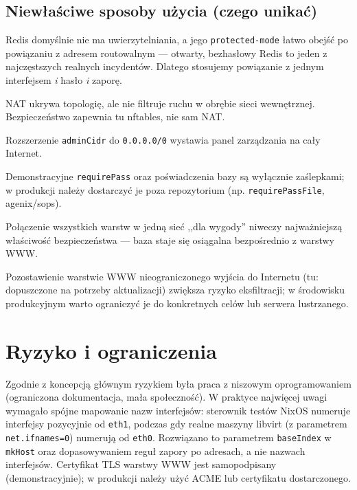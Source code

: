 \documentclass[11pt,a4paper]{article}
\begin{document}
\subsection{Niewłaściwe sposoby użycia (czego unikać)}
\begin{description}[style=unboxed,leftmargin=1.2em]
  \item[Wystawienie Redis/PostgreSQL na adresie ,,wildcard''.] Redis domyślnie
  nie ma uwierzytelniania, a jego \texttt{protected-mode} łatwo obejść po
  powiązaniu z adresem routowalnym --- otwarty, bezhasłowy Redis to jeden z
  najczęstszych realnych incydentów. Dlatego stosujemy powiązanie z jednym
  interfejsem \emph{i} hasło \emph{i} zaporę.
  \item[Traktowanie NAT jak zapory.] NAT ukrywa topologię, ale nie filtruje
  ruchu w obrębie sieci wewnętrznej. Bezpieczeństwo zapewnia tu nftables, nie
  sam NAT.
  \item[Zbyt szeroki zakres SSH.] Rozszerzenie \texttt{adminCidr} do
  \texttt{0.0.0.0/0} wystawia panel zarządzania na cały Internet.
  \item[Sekrety w repozytorium.] Demonstracyjne \texttt{requirePass} oraz
  poświadczenia bazy są wyłącznie zaślepkami; w produkcji należy dostarczyć je
  poza repozytorium (np. \texttt{requirePassFile}, agenix/sops).
  \item[Spłaszczenie segmentacji.] Połączenie wszystkich warstw w jedną sieć
  ,,dla wygody'' niweczy najważniejszą właściwość bezpieczeństwa --- baza
  staje się osiągalna bezpośrednio z warstwy WWW.
  \item[Nadmierny egress.] Pozostawienie warstwie WWW nieograniczonego wyjścia
  do Internetu (tu: dopuszczone na potrzeby aktualizacji) zwiększa ryzyko
  eksfiltracji; w środowisku produkcyjnym warto ograniczyć je do konkretnych
  celów lub serwera lustrzanego.
\end{description}

\section{Ryzyko i ograniczenia}
Zgodnie z koncepcją głównym ryzykiem była praca z niszowym oprogramowaniem
(ograniczona dokumentacja, mała społeczność). W praktyce najwięcej uwagi
wymagało spójne mapowanie nazw interfejsów: sterownik testów NixOS numeruje
interfejsy pozycyjnie od \texttt{eth1}, podczas gdy realne maszyny libvirt
(z parametrem \texttt{net.ifnames=0}) numerują od \texttt{eth0}. Rozwiązano to
parametrem \texttt{baseIndex} w \texttt{mkHost} oraz dopasowywaniem reguł zapory
po adresach, a nie nazwach interfejsów. Certyfikat TLS warstwy WWW jest
samopodpisany (demonstracyjnie); w produkcji należy użyć ACME lub certyfikatu
dostarczonego.
\end{document}
